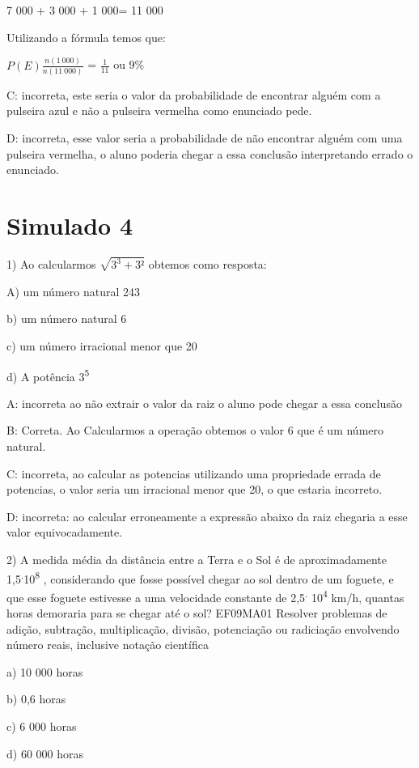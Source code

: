 7 000 + 3 000 + 1 000= 11 000

Utilizando a fórmula temos que:

\(P(E)\frac{n(1\ 000)}{n(11\ 000)}\) = \(\frac{1}{11}\) ou 9\%

C: incorreta, este seria o valor da probabilidade de encontrar alguém
com a pulseira azul e não a pulseira vermelha como enunciado pede.

D: incorreta, esse valor seria a probabilidade de não encontrar alguém
com uma pulseira vermelha, o aluno poderia chegar a essa conclusão
interpretando errado o enunciado.

\hypertarget{simulado-4}{%
\section{Simulado 4}\label{simulado-4}}

1) Ao calcularmos \(\sqrt{3^{3} + 3²}\) obtemos como resposta:

A) um número natural 243

b) um número natural 6

c) um número irracional menor que 20

d) A potência 3\textsuperscript{5}

A: incorreta ao não extrair o valor da raiz o aluno pode chegar a essa
conclusão

B: Correta. Ao Calcularmos a operação obtemos o valor 6 que é um número
natural.

C: incorreta, ao calcular as potencias utilizando uma propriedade errada
de potencias, o valor seria um irracional menor que 20, o que estaria
incorreto.

D: incorreta: ao calcular erroneamente a expressão abaixo da raiz
chegaria a esse valor equivocadamente.

2) A medida média da distância entre a Terra e o Sol é de
aproximadamente 1,5\textsuperscript{.}10\textsuperscript{8} ,
considerando que fosse possível chegar ao sol dentro de um foguete, e
que esse foguete estivesse a uma velocidade constante de
2,5\textsuperscript{.} 10\textsuperscript{4} km/h, quantas horas
demoraria para se chegar até o sol? EF09MA01 Resolver problemas de
adição, subtração, multiplicação, divisão, potenciação ou radiciação
envolvendo número reais, inclusive notação científica

a) 10 000 horas

b) 0,6 horas

c) 6 000 horas

d) 60 000 horas

